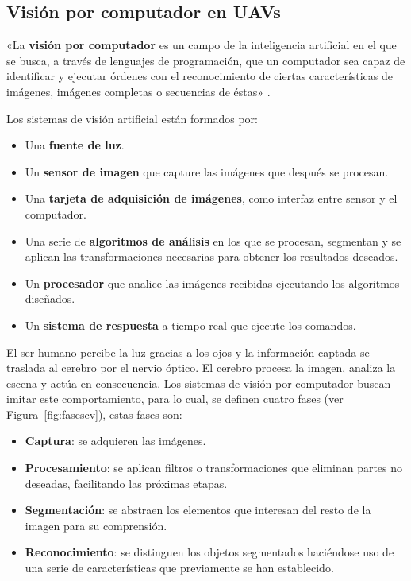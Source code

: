 \subsection{Visión por computador en \acs{UAV}s}
\label{sec:visionporcomputador}

«La \textbf{visión por computador} es un campo de la inteligencia artificial en el que se busca, a través de lenguajes de programación, que un computador sea capaz de identificar y ejecutar órdenes con el reconocimiento de ciertas características de imágenes, imágenes completas o secuencias de éstas» \cite{visionporcomputador}.

Los sistemas de visión artificial están formados por: 
\begin{itemize}
\item Una \textbf{fuente de luz}.
\item Un \textbf{sensor de imagen} que capture las imágenes que después se procesan.
\item Una \textbf{tarjeta de adquisición de imágenes}, como interfaz entre sensor y el computador.
\item Una serie de \textbf{algoritmos de análisis} en los que se procesan, segmentan y se aplican las transformaciones necesarias para obtener los resultados deseados. 
\item Un \textbf{procesador} que analice las imágenes recibidas ejecutando los algoritmos diseñados. 
\item Un \textbf{sistema de respuesta} a tiempo real que ejecute los comandos.
\end{itemize}

El ser humano percibe la luz gracias a los ojos y la información captada se traslada al cerebro por el nervio óptico. El cerebro procesa la imagen, analiza la escena y actúa en consecuencia. Los sistemas de visión por computador buscan imitar este comportamiento, para lo cual, se definen cuatro fases (ver Figura~\ref{fig:fasescv}), estas fases son:

\begin{itemize}
\item \textbf{Captura}: se adquieren las imágenes.
\item \textbf{Procesamiento}: se aplican filtros o transformaciones que eliminan partes no deseadas, facilitando las próximas etapas.
\item \textbf{Segmentación}: se abstraen los elementos que interesan del resto de la imagen para su comprensión.
\item \textbf{Reconocimiento}: se distinguen los objetos segmentados haciéndose uso de una serie de características que previamente se han establecido.
\end{itemize}

